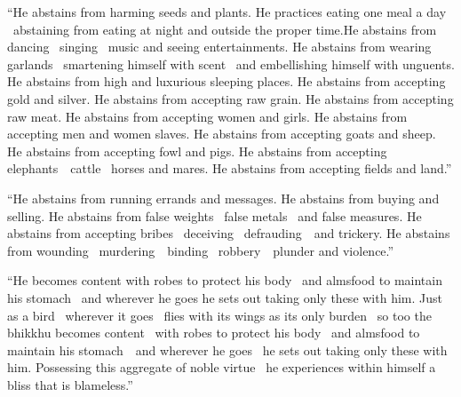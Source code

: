 \begin{english-only-justify}
  ``He abstains from harming seeds and plants. He practices eating one meal a day \breathmark\ abstaining from eating at night and outside the proper time.\makeatletter\hyperlink{endnote148-appendix}\makeatother\thinspace He abstains from dancing \breathmark\ singing \breathmark\ music and seeing entertainments. He abstains from wearing garlands \breathmark\ smartening himself with scent \breathmark\ and embellishing himself with unguents. He abstains from high and luxurious sleeping places. He abstains from accepting gold and silver. He abstains from accepting raw grain. He abstains from accepting raw meat. He abstains from accepting women and girls. He abstains from accepting men and women slaves. He abstains from accepting goats and sheep. He abstains from accepting fowl and pigs. He abstains from accepting \mbox{elephants}~\breathmark\ cattle \breathmark\ horses and mares. He abstains from accepting fields and land.''
\end{english-only-justify}

\begin{english-only-justify}
  ``He abstains from running errands and messages. He abstains from buying and selling. He abstains from false weights \breathmark\ false metals \breathmark\ and false measures. He abstains from accepting bribes \breathmark\ deceiving \breathmark\ \mbox{defrauding}~\breathmark\ and trickery. He abstains from wounding \breathmark\ \mbox{murdering}~\breathmark\ binding \breathmark\ \mbox{robbery}~\breathmark\ plunder and violence.''
\end{english-only-justify}

\begin{english-only-justify}
  ``He becomes content with robes to protect his body \breathmark\ and almsfood to maintain his stomach \breathmark\ and wherever he goes he sets out taking only these with him. Just as a bird \breathmark\ wherever it goes \breathmark\ flies with its wings as its only burden \breathmark\ so too the bhikkhu becomes content \breathmark\ with robes to protect his body \breathmark\ and almsfood to maintain his \mbox{stomach}~\breathmark\ and wherever he goes \breathmark\ he sets out taking only these with him. Possessing this aggregate of noble virtue \breathmark\ he experiences within himself a bliss that is blameless.''
\end{english-only-justify}

